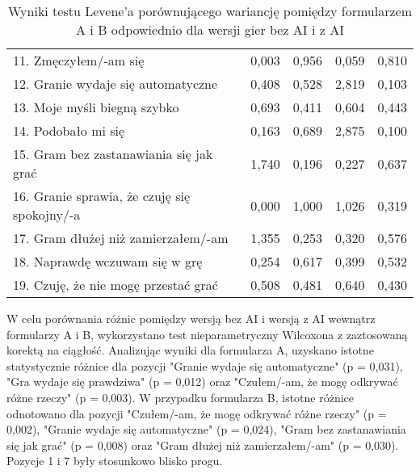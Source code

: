 \begin{table}[!h]
\begin{center}
\begin{tabular}{|m{10em}|m{5em}|m{5em}|m{5em}|m{5em}|}
            11. Zmęczyłem/-am się                                             & 0,003                       & 0,956            & 0,059                   & 0,810        \\
            12. Granie wydaje się automatyczne                                & 0,408                       & 0,528            & 2,819                   & 0,103        \\
            13. Moje myśli \newline biegną szybko                             & 0,693                       & 0,411            & 0,604                   & 0,443        \\
            14. Podobało mi się                                               & 0,163                       & 0,689            & 2,875                   & 0,100        \\
            15. Gram bez zastanawiania się jak grać                           & 1,740                       & 0,196            & 0,227                   & 0,637        \\
            16. Granie sprawia, \newline że czuję się spokojny/-a             & 0,000                       & 1,000            & 1,026                   & 0,319        \\
            17. Gram dłużej \newline niż zamierzałem/-am                      & 1,355                       & 0,253            & 0,320                   & 0,576        \\
            18. Naprawdę wczuwam się w grę                                    & 0,254                       & 0,617            & 0,399                   & 0,532        \\
            19. Czuję, że nie mogę przestać grać                              & 0,508                       & 0,481            & 0,640                   & 0,430        \\
            \hline
        \end{tabular}
    \end{center}
    \caption{Wyniki testu Levene'a porównującego wariancję pomiędzy formularzem A i B odpowiednio dla wersji gier bez AI i z AI}\label{tab1:ch7_12}
\end{table}

\clearpage

W celu porównania różnic pomiędzy wersją bez AI i wersją z AI wewnątrz formularzy A i B, wykorzystano test
nieparametryczny Wilcoxona z zaztosowaną korektą na ciągłość. Analizując wyniki dla formularza A, uzyskano istotne statystycznie różnice dla
pozycji "Granie wydaje się automatyczne" (p = 0,031), "Gra wydaje się prawdziwa" (p = 0,012) oraz "Czułem/-am, że
mogę odkrywać różne rzeczy" (p = 0,003). W przypadku formularza B, istotne różnice odnotowano dla pozycji
"Czułem/-am, że mogę odkrywać różne rzeczy" (p = 0,002), "Granie wydaje się automatyczne" (p = 0,024),
"Gram bez zastanawiania się jak grać" (p = 0,008) oraz "Gram dłużej niż zamierzałem/-am" (p = 0,030). Pozycje 1 i 7
były stosunkowo blisko progu.

